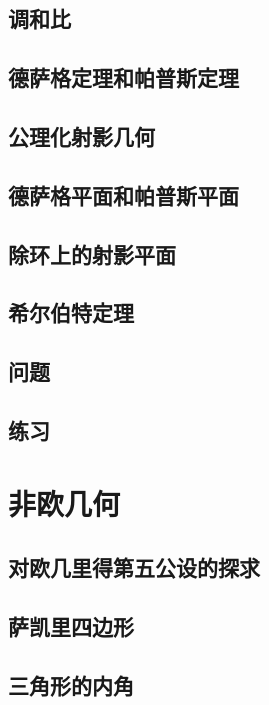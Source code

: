 \documentclass[cn,fancy,blue,11pt]{elegantbook}
\begin{document}
\section{调和比}

\section{德萨格定理和帕普斯定理}

\section{公理化射影几何}

\section{德萨格平面和帕普斯平面}

\section{除环上的射影平面}

\section{希尔伯特定理}

\section{问题}

\section{练习}

\chapter{非欧几何}

\section{对欧几里得第五公设的探求}

\section{萨凯里四边形}

\section{三角形的内角}
\end{document}
